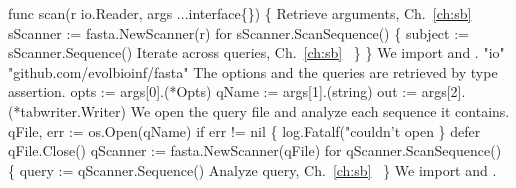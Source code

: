 func scan(r io.Reader, args ...interface\{\}) \{
          \LA{}Retrieve arguments, Ch.~\ref{ch:sb}~{\nwtagstyle{}}\RA{}
          sScanner := fasta.NewScanner(r)
          for sScanner.ScanSequence() \{
                  subject := sScanner.Sequence()
                  \LA{}Iterate across queries, Ch.~\ref{ch:sb}~{\nwtagstyle{}}\RA{}
          \}
\}
\nwendcode{}\nwdocspar
We import  and .
\nwenddocs{}\plusendmoddef\nwstartdeflinemarkup{}\nwenddeflinemarkup
"io"
"github.com/evolbioinf/fasta"
\nwendcode{}\nwdocspar
The options and the queries are retrieved by type assertion.
\nwenddocs{}\endmoddef\nwstartdeflinemarkup{}\nwenddeflinemarkup
opts := args[0].(*Opts)
qName := args[1].(string)
out := args[2].(*tabwriter.Writer)
\nwendcode{}\nwdocspar
We open the query file and analyze each sequence it contains.
\nwenddocs{}\endmoddef\nwstartdeflinemarkup{}\nwenddeflinemarkup
qFile, err := os.Open(qName)
if err != nil \{
          log.Fatalf("couldn't open %
\}
defer qFile.Close()
qScanner := fasta.NewScanner(qFile)
for qScanner.ScanSequence() \{
          query := qScanner.Sequence()
          \LA{}Analyze query, Ch.~\ref{ch:sb}~{\nwtagstyle{}}\RA{}
\}
\nwendcode{}\nwdocspar
We import  and .
